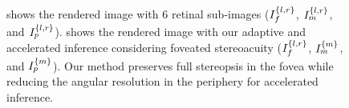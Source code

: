 \begin{figure}[hb]
    \centering
    
    
    {%
     shows the rendered image with 6 retinal sub-images ($I_{f}^{\{l,r\}}$, $I_{m}^{\{l,r\}}$, and $I_{p}^{\{l,r\}}$).
     shows the rendered image with our adaptive and accelerated inference considering foveated stereoacuity ($I_{f}^{\{l,r\}}$, $I_{m}^{\{m\}}$, and $I_{p}^{\{m\}}$). Our method preserves full stereopsis in the fovea while reducing the angular resolution in the periphery for accelerated inference.
    }
    \label{fig:mono}
\end{figure}